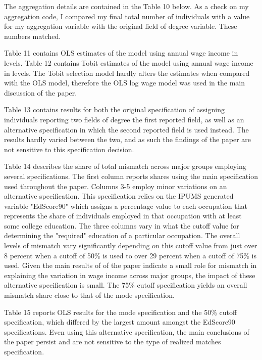 \documentclass[11pt]{article}
\theoremstyle{definition}
\begin{document}
\vspace{2mm}
The aggregation details are contained in the Table 10 below.  As a check on my aggregation code, I compared my final total number of individuals with a value for my aggregation variable with the original field of degree variable.  These numbers matched.

Table 11 contains OLS estimates of the model using annual wage income in levels.  Table 12 contains Tobit estimates of the model using annual wage income in levels.  The Tobit selection model hardly alters the estimates when compared with the OLS model, therefore the OLS log wage model was used in the main discussion of the paper.    

Table 13 contains results for both the original specification of assigning individuals reporting two fields of degree the first reported field, as well as an alternative specification in which the second reported field is used instead.  The results hardly varied between the two, and as such the findings of the paper are not sensitive to this specification decision.  

 Table 14 describes the share of total mismatch across major groups employing several specifications.  The first column reports shares using the main specification used throughout the paper.  Columns 3-5 employ minor variations on an alternative specification.  This specification relies on the IPUMS generated variable "EdScore90" which assigns a percentage value to each occupation that represents the share of individuals employed in that occupation with at least some college education.  The three columns vary in what the cutoff value for determining the "required" education of a particular occupation.  The overall levels of mismatch vary significantly depending on this cutoff value from just over 8 percent when a cutoff of 50\% is used to over 29 percent when a cutoff of 75\% is used.  Given the main results of of the paper indicate a small role for mismatch in explaining the variation in wage income across major groups, the impact of these alternative specification is small.  The 75\% cutoff specification yields an overall mismatch share close to that of the mode specification.  
 
 Table 15 reports OLS results for the mode specification and the 50\% cutoff specification, which differed by the largest amount amongst the EdScore90 specifications.  Even using this alternative specification, the main conclusions of the paper persist and are not sensitive to the type of realized matches specification.
\end{document}
